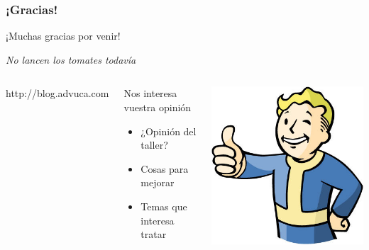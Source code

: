 \begin{frame}
	\frametitle{¡Gracias!}
	
	\begin{center}
    \huge{¡Muchas gracias por venir!}
    \end{center}
		
    \begin{center}
        \emph{No lancen los tomates todavía}
    \end{center}
    
	\begin{columns}[c]
	\column{200pt}	
	
	http://blog.advuca.com
	
	\begin{block}{Nos interesa vuestra opinión}
        \begin{itemize}
            \item ¿Opinión del taller?
            \item Cosas para mejorar
            \item Temas que interesa tratar
        \end{itemize}
    \end{block}
	
	\column{100pt}
	\begin{center}
	    \includegraphics[scale=0.3]{img/thumbs-up.jpg}
	\end{center}   
    
    \end{columns}  
	
\end{frame}
